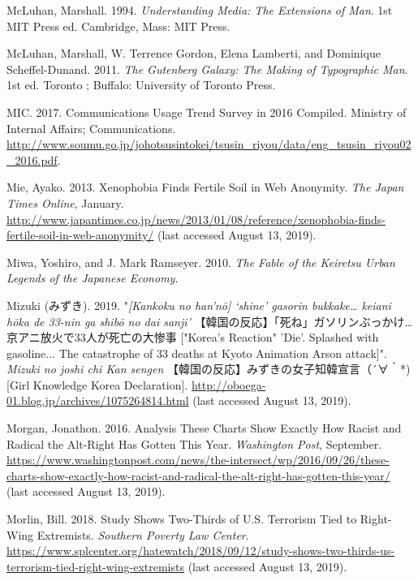 \documentclass[10pt,british,A4paper,oneside]{memoir}
\begin{document}
\hypertarget{ref-mcluhan_understanding_1994}{}
McLuhan, Marshall. 1994. \emph{Understanding Media: The Extensions of
Man}. 1st MIT Press ed. Cambridge, Mass: MIT Press.

\hypertarget{ref-mcluhan_gutenberg_2011}{}
McLuhan, Marshall, W. Terrence Gordon, Elena Lamberti, and Dominique
Scheffel-Dunand. 2011. \emph{The Gutenberg Galaxy: The Making of
Typographic Man}. 1st ed. Toronto ; Buffalo: University of Toronto
Press.

\hypertarget{ref-mic_communications_2017}{}
MIC. 2017. Communications Usage Trend Survey in 2016 Compiled. Ministry
of Internal Affairs; Communications.
\url{http://www.soumu.go.jp/johotsusintokei/tsusin_riyou/data/eng_tsusin_riyou02_2016.pdf}.

\hypertarget{ref-mie_xenophobia_2013}{}
Mie, Ayako. 2013. Xenophobia Finds Fertile Soil in Web Anonymity.
\emph{The Japan Times Online}, January.
\url{http://www.japantimes.co.jp/news/2013/01/08/reference/xenophobia-finds-fertile-soil-in-web-anonymity/} (last accessed August 13, 2019).

\hypertarget{ref-miwa_fable_2010}{}
Miwa, Yoshiro, and J. Mark Ramseyer. 2010. \emph{The Fable of the
Keiretsu Urban Legends of the Japanese Economy}.

\hypertarget{ref-mizuki_eng._2019}{}
Mizuki (みずき). 2019. "\emph{[Kankoku no han'nō] `shine' gasorin bukkake… keiani hōka de 33-nin ga shibō no dai sanji'} 【韓国の反応】「死ね」ガソリンぶっかけ…京アニ放火で33人が死亡の大惨事 ["Korea's Reaction" 'Die'. Splashed with gasoline... The catastrophe of 33 deaths at Kyoto Animation Arson attack]". \emph{Mizuki no joshi chi Kan sengen} 【韓国の反応】みずきの女子知韓宣言（´∀｀*) [Girl Knowledge Korea Declaration]. \url{http://oboega-01.blog.jp/archives/1075264814.html} (last accessed August 13, 2019).

\hypertarget{ref-morgan_analysis_2016}{}
Morgan, Jonathon. 2016. Analysis These Charts Show Exactly How Racist
and Radical the Alt-Right Has Gotten This Year. \emph{Washington Post},
September.
\url{https://www.washingtonpost.com/news/the-intersect/wp/2016/09/26/these-charts-show-exactly-how-racist-and-radical-the-alt-right-has-gotten-this-year/} (last accessed August 13, 2019).

\hypertarget{ref-morlin_study_2018}{}
Morlin, Bill. 2018. Study Shows Two-Thirds of U.S. Terrorism Tied to
Right-Wing Extremists. \emph{Southern Poverty Law Center}.
\url{https://www.splcenter.org/hatewatch/2018/09/12/study-shows-two-thirds-us-terrorism-tied-right-wing-extremists} (last accessed August 13, 2019).
\end{document}
